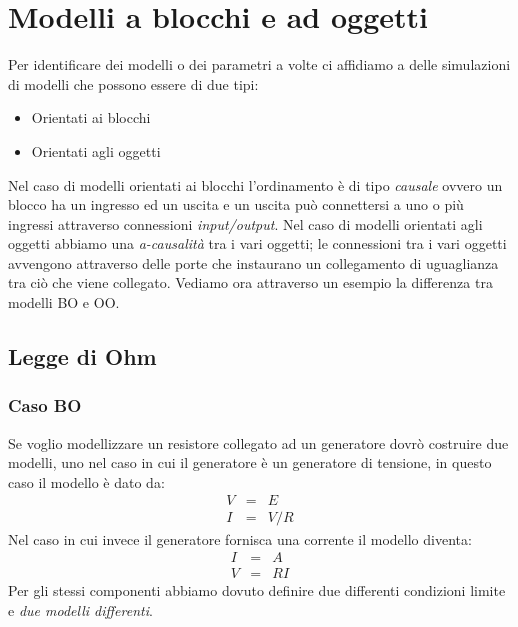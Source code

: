 \label{capitolo3}
\section{Modelli a blocchi e ad oggetti}
Per identificare dei modelli o dei parametri a volte ci affidiamo a delle simulazioni di modelli che possono essere di due tipi:
\begin{itemize}
\item Orientati ai blocchi
\item Orientati agli oggetti
\end{itemize}
Nel caso di modelli orientati ai blocchi l'ordinamento è di tipo \emph{causale} ovvero un blocco ha un ingresso ed un uscita e un uscita può connettersi a uno o più ingressi attraverso connessioni \emph{input/output}.
Nel caso di modelli orientati agli oggetti abbiamo una \emph{a-causalità} tra i vari oggetti; le connessioni tra i vari oggetti avvengono attraverso delle porte che instaurano un collegamento di uguaglianza tra ciò che viene collegato.
Vediamo ora attraverso un esempio la differenza tra modelli BO e OO.
\subsection{Legge di Ohm}
\subsubsection{Caso BO}
Se voglio modellizzare un resistore collegato ad un generatore dovrò costruire due modelli, uno nel caso in cui il generatore è un generatore di tensione, in questo caso il modello è dato da:
$$
\begin{array}{ccc}
V&=&E\\
I&=&V/R
\end{array}
$$
Nel caso in cui invece il generatore fornisca una corrente il modello diventa:
$$
\begin{array}{ccc}
I&=&A\\
V&=&RI
\end{array}
$$
Per gli stessi componenti abbiamo dovuto definire due differenti condizioni limite e \emph{due modelli differenti}.

